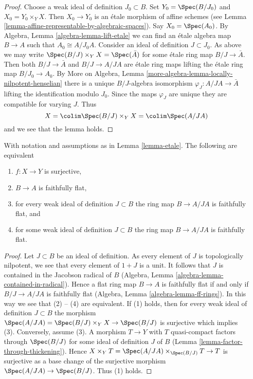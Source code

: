 \begin{proof}
Choose a weak ideal of definition $J_0 \subset B$. Set
$Y_0 = \Spec(B/J_0)$ and $X_0 = Y_0 \times_Y X$. Then $X_0 \to Y_0$
is an \'etale morphism of affine schemes (see
Lemma \ref{lemma-affine-representable-by-algebraic-spaces}).
Say $X_0 = \Spec(A_0)$. By Algebra, Lemma \ref{algebra-lemma-lift-etale}
we can find an \'etale algebra map $B \to A$ such that
$A_0 \cong A/J_0A$. Consider an ideal of definition $J \subset J_0$.
As above we may write $\Spec(B/J) \times_Y X = \Spec(\bar A)$
for some \'etale ring map $B/J \to \bar A$. Then both
$B/J \to \bar A$ and $B/J \to A/JA$ are \'etale ring maps
lifting the \'etale ring map $B/J_0 \to A_0$. By
More on Algebra, Lemma \ref{more-algebra-lemma-locally-nilpotent-henselian}
there is a unique $B/J$-algebra isomorphism
$\varphi_J : A/JA \to \bar A$ lifting the identification modulo $J_0$.
Since the maps $\varphi_J$ are unique they are compatible for varying $J$.
Thus
$$
X = \colim \Spec(B/J) \times_Y X = \colim \Spec(A/JA)
$$
and we see that the lemma holds.
\end{proof}

\begin{lemma}
\label{lemma-etale-surjective}
With notation and assumptions as in Lemma \ref{lemma-etale}.
The following are equivalent
\begin{enumerate}
\item $f : X \to Y$ is surjective,
\item $B \to A$ is faithfully flat,
\item for every weak ideal of definition $J \subset B$
the ring map $B \to A/JA$ is faithfully flat, and
\item for some weak ideal of definition $J \subset B$
the ring map $B \to A/JA$ is faithfully flat.
\end{enumerate}
\end{lemma}

\begin{proof}
Let $J \subset B$ be an ideal of definition. As every element of $J$
is topologically nilpotent, we see that every element of $1 + J$ is
a unit. It follows that $J$ is contained in the Jacobson radical of $B$
(Algebra, Lemma \ref{algebra-lemma-contained-in-radical}).
Hence a flat ring map $B \to A$ is faithfully flat if and only if
$B/J \to A/JA$ is faithfully flat
(Algebra, Lemma \ref{algebra-lemma-ff-rings}).
In this way we see that (2) -- (4) are equivalent.
If (1) holds, then for every weak ideal of definition $J \subset B$
the morphism
$\Spec(A/JA) = \Spec(B/J) \times_Y X \to \Spec(B/J)$ is surjective
which implies (3). Conversely, assume (3).
A morphism $T \to Y$ with $T$ quasi-compact
factors through $\Spec(B/J)$ for some ideal of definition $J$ of $B$
(Lemma \ref{lemma-factor-through-thickening}).
Hence $X \times_Y T = \Spec(A/JA) \times_{\Spec(B/J)} T \to T$
is surjective as a base change of the surjective morphism
$\Spec(A/JA) \to \Spec(B/J)$. Thus (1) holds.
\end{proof}





